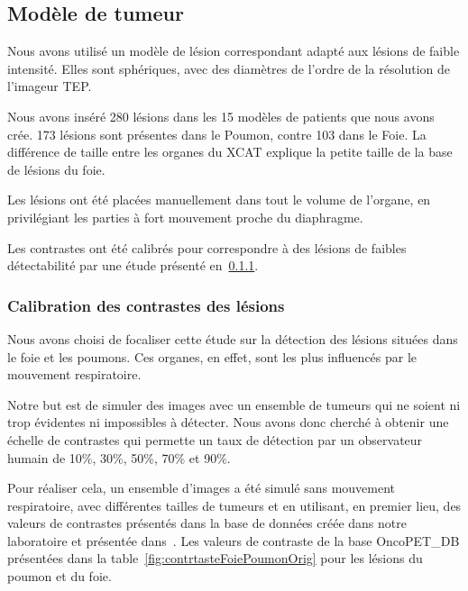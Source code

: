 \subsection{Modèle de tumeur}


Nous avons utilisé un modèle de lésion correspondant adapté aux lésions de faible intensité. Elles sont sphériques, avec des diamètres de l'ordre de la résolution de l'imageur TEP.

Nous avons inséré 280 lésions dans les 15 modèles de patients que nous avons crée. 173 lésions sont présentes dans le Poumon, contre 103 dans le Foie. La différence de taille entre les organes du XCAT explique la petite taille de la base de lésions du foie. 

Les lésions ont été placées manuellement dans tout le volume de l'organe, en privilégiant les parties à fort mouvement proche du diaphragme. 

Les contrastes ont été calibrés pour correspondre à des lésions de faibles détectabilité par une étude présenté en~\ref{lab:etudeDetect}.

\subsubsection{Calibration des contrastes des lésions}
\label{lab:etudeDetect}

Nous avons choisi de focaliser cette étude sur la détection des lésions situées dans le foie et les poumons. Ces organes, en effet, sont les plus influencés par le mouvement respiratoire.

Notre but est de simuler des images avec un ensemble de tumeurs qui ne soient ni trop évidentes ni impossibles à détecter. Nous avons donc cherché à obtenir une échelle de contrastes qui permette un taux de détection par un observateur humain de 10\%, 30\%, 50\%, 70\% et 90\%.

Pour réaliser cela, un ensemble d'images a été simulé sans mouvement respiratoire, avec différentes tailles de tumeurs et en utilisant, en premier lieu, des valeurs de contrastes présentés dans la base de données créée dans notre laboratoire et présentée dans~\cite{tomei2010oncopet_db}. Les valeurs de contraste de la base OncoPET\_DB présentées dans la table~\ref{fig:contrtasteFoiePoumonOrig} pour les lésions du poumon et du foie.


